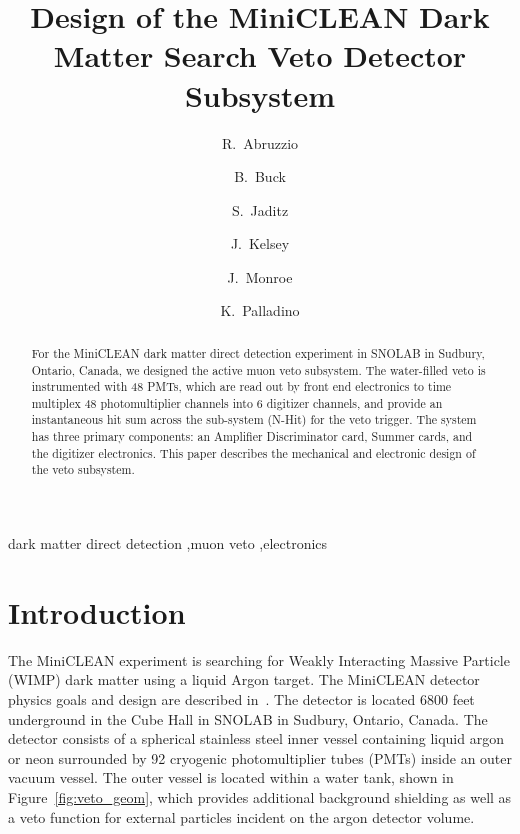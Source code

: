 \documentclass[preprint,12pt]{elsarticle}
\begin{document}
\begin{frontmatter}
\title{Design of the MiniCLEAN Dark Matter Search Veto Detector Subsystem}
\author[mit]{R.~Abruzzio}
\author[mit]{B.~Buck}
\author[lanl]{S.~Jaditz}
\author[mit]{J.~Kelsey}
\author[rhul]{J.~Monroe}
\author[mit]{K.~Palladino}
\address[lanl]{Los Alamos National Laboratory, Los Alamos, NM, USA}
\address[mit]{Massachusetts Institute of Technology, Cambridge, MA, USA}
\address[rhul]{Royal Holloway University of London, Egham, Surrey, UK}
\begin{abstract}
For the MiniCLEAN dark matter direct detection experiment in SNOLAB in Sudbury, Ontario, Canada, we designed the active muon veto subsystem.  The water-filled veto is instrumented with 48 PMTs, which are read out by front end electronics to time multiplex 48 photomultiplier channels into 6 digitizer channels, and provide an instantaneous hit sum across the sub-system (N-Hit) for the veto trigger.  The system has three primary components: an Amplifier Discriminator card, Summer cards, and the digitizer electronics.  This paper describes the mechanical and electronic design of the veto subsystem.
\end{abstract}

\begin{keyword}
dark matter direct detection \sep muon veto \sep electronics
\end{keyword}

\end{frontmatter}

\section{Introduction}
\label{Introduction}
The MiniCLEAN experiment is searching for Weakly Interacting Massive Particle (WIMP) dark matter using a liquid Argon target.  The MiniCLEAN detector physics goals and design are described in~\cite{ref:miniclean_physics}.  The detector is located 6800 feet underground in the Cube Hall in SNOLAB in Sudbury, Ontario, Canada.  The detector consists of a spherical stainless steel inner vessel containing liquid argon or neon surrounded by 92 cryogenic photomultiplier tubes (PMTs) inside an outer vacuum vessel. The outer vessel is located within a water tank, shown in Figure~\ref{fig:veto_geom}, which provides additional background shielding as well as a veto function for external particles incident on the argon detector volume.  
\end{document}
